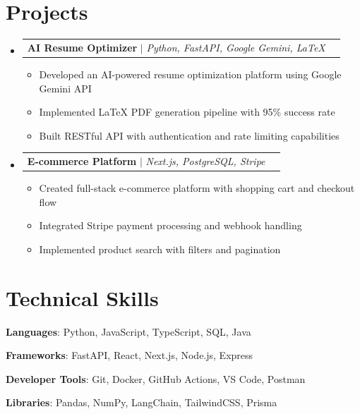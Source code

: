 \documentclass[letterpaper,11pt]{article}
\makeatletter
\newcommand{\resumeItem}[1]{
  \item\small{
    {#1 \vspace{-2pt}}
  }
}
\newcommand{\resumeProjectHeading}[2]{
    \item
    \begin{tabular*}{0.97\textwidth}{l@{\extracolsep{\fill}}r}
      \small#1 & #2 \\
    \end{tabular*}\vspace{-7pt}
}
\newcommand{\resumeSubHeadingListStart}{\begin{itemize}[leftmargin=0.15in, label={}]}
\newcommand{\resumeSubHeadingListEnd}{\end{itemize}}
\newcommand{\resumeItemListStart}{\begin{itemize}}
\newcommand{\resumeItemListEnd}{\end{itemize}\vspace{-5pt}}
\makeatother
\begin{document}
\section{Projects}
  \resumeSubHeadingListStart
    \resumeProjectHeading
      {\textbf{AI Resume Optimizer} $|$ \emph{Python, FastAPI, Google Gemini, LaTeX}}{}
      \resumeItemListStart
        \resumeItem{Developed an AI-powered resume optimization platform using Google Gemini API}
        \resumeItem{Implemented LaTeX PDF generation pipeline with 95\% success rate}
        \resumeItem{Built RESTful API with authentication and rate limiting capabilities}
      \resumeItemListEnd
    \resumeProjectHeading
      {\textbf{E-commerce Platform} $|$ \emph{Next.js, PostgreSQL, Stripe}}{}
      \resumeItemListStart
        \resumeItem{Created full-stack e-commerce platform with shopping cart and checkout flow}
        \resumeItem{Integrated Stripe payment processing and webhook handling}
        \resumeItem{Implemented product search with filters and pagination}
      \resumeItemListEnd
  \resumeSubHeadingListEnd


\section{Technical Skills}
 \begin{itemize}[leftmargin=0.15in, label={}]
    \small{\item{
    \resumeItem{\textbf{Languages}: Python, JavaScript, TypeScript, SQL, Java}
    \resumeItem{\textbf{Frameworks}: FastAPI, React, Next.js, Node.js, Express}
    \resumeItem{\textbf{Developer Tools}: Git, Docker, GitHub Actions, VS Code, Postman}
    \resumeItem{\textbf{Libraries}: Pandas, NumPy, LangChain, TailwindCSS, Prisma}
    }}
 \end{itemize}


\end{document}
